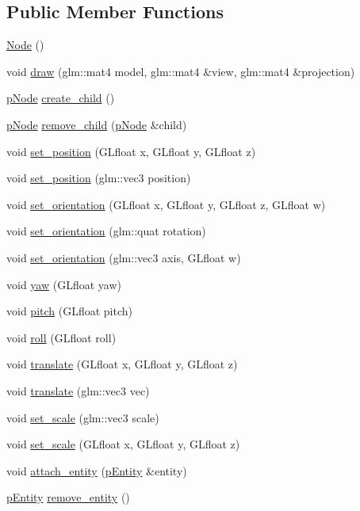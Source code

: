 \subsection*{Public Member Functions}
\begin{DoxyCompactItemize}
\item 
\hyperlink{classNode_ad7a34779cad45d997bfd6d3d8043c75f}{Node} ()
\item 
void \hyperlink{classNode_a68d5f074d4d9487384500bdcc80d489b}{draw} (glm\+::mat4 model, glm\+::mat4 \&view, glm\+::mat4 \&projection)
\item 
\hyperlink{Node_8hpp_ac189bcbe7762c82a1a30c219d6ebdf75}{p\+Node} \hyperlink{classNode_ac9fb91f489ca00c8e91f10eda66cfffe}{create\+\_\+child} ()
\item 
\hyperlink{Node_8hpp_ac189bcbe7762c82a1a30c219d6ebdf75}{p\+Node} \hyperlink{classNode_abdaf4340bd75b5621c0a75f18590476e}{remove\+\_\+child} (\hyperlink{Node_8hpp_ac189bcbe7762c82a1a30c219d6ebdf75}{p\+Node} \&child)
\item 
void \hyperlink{classNode_ac2eb884b8982645f6d7438025a60cbff}{set\+\_\+position} (G\+Lfloat x, G\+Lfloat y, G\+Lfloat z)
\item 
void \hyperlink{classNode_a056137e4e51a4587490451c1dbefb23e}{set\+\_\+position} (glm\+::vec3 position)
\item 
void \hyperlink{classNode_a02c9938a7714e058c07b453552b6ad6d}{set\+\_\+orientation} (G\+Lfloat x, G\+Lfloat y, G\+Lfloat z, G\+Lfloat w)
\item 
void \hyperlink{classNode_a37476444f918a2e23f6229845dc44f6e}{set\+\_\+orientation} (glm\+::quat rotation)
\item 
void \hyperlink{classNode_a4fe91fd27202fb20d219ba476e6ff3a1}{set\+\_\+orientation} (glm\+::vec3 axis, G\+Lfloat w)
\item 
void \hyperlink{classNode_a6bdc035991cc9518b6139d34e32603a8}{yaw} (G\+Lfloat yaw)
\item 
void \hyperlink{classNode_aa88c3fa387ddc4c8991c20f6e901a247}{pitch} (G\+Lfloat pitch)
\item 
void \hyperlink{classNode_a078e56eb86c4049d9c282485b8439cf1}{roll} (G\+Lfloat roll)
\item 
void \hyperlink{classNode_a0c403c5effe407349dea4039eb2987be}{translate} (G\+Lfloat x, G\+Lfloat y, G\+Lfloat z)
\item 
void \hyperlink{classNode_abfa9ae84c73cd9197dd27aee75e595ce}{translate} (glm\+::vec3 vec)
\item 
void \hyperlink{classNode_a3faec015e7b7739ee810a44540aa2250}{set\+\_\+scale} (glm\+::vec3 scale)
\item 
void \hyperlink{classNode_ad136d4dc5400c4091ea22e6d24a445e5}{set\+\_\+scale} (G\+Lfloat x, G\+Lfloat y, G\+Lfloat z)
\item 
void \hyperlink{classNode_a778a680844ceddae2c5fd76755a5d99d}{attach\+\_\+entity} (\hyperlink{Entity_8hpp_ae424507ba09ae72f3c142ce741f3a1e7}{p\+Entity} \&entity)
\item 
\hyperlink{Entity_8hpp_ae424507ba09ae72f3c142ce741f3a1e7}{p\+Entity} \hyperlink{classNode_ad27c6c51391f092f6dc2fdea545f283d}{remove\+\_\+entity} ()
\end{DoxyCompactItemize}


